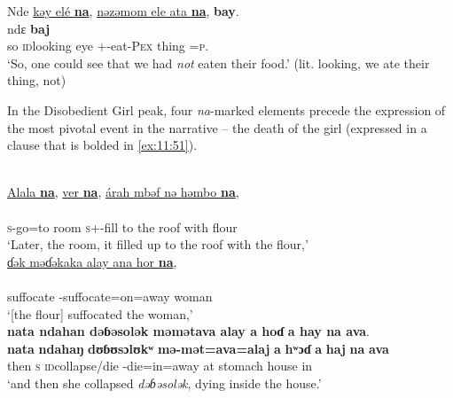 \ea \label{ex:11:50}
Nde  \underline{kəy  elé  \textbf{na}},  \underline{nəzəmom  ele  ata  \textbf{na}},  \textbf{bay}.\\
\gll  ndɛ                           \textbf{baj}\\
      so  \textsc{id}looking  eye  {\PSP}  +{\PFV}-eat-\textsc{Pex}    thing  =\textsc{p}.{\POSS}  {\PSP}  {\NEG}\\
\glt  ‘So, one could see that we had \textit{not} eaten their food.’ (lit. looking, we ate their thing, not)
\z

In the Disobedient Girl peak, four \textit{na}{}-marked elements precede the expression of the most pivotal event in the narrative -- the death of the girl (expressed in a clause that is bolded in \ref{ex:11:51}). 

\ea \label{ex:11:51}
\\
\underline{Alala  \textbf{na}},  \underline{ver  \textbf{na}},  \underline{árah  mbəf  nə  həmbo  \textbf{na}},\\ 
\gll  {}                    \\      
      \textsc{s}-go=to  {\PSP} room  {\PSP} \textsc{s}+{\IFV}-fill  {to the roof}  with  flour  {\PSP} \\      
\glt ‘Later, the room, it filled up to the roof with the flour,’\\

\medskip
\underline{ɗək  məɗəkaka  alay  ana  hor  \textbf{na}},\\
\gll {}        \\
     suffocate  {\NOM}{}-suffocate=on=away  {\DAT} woman  {\PSP}   \\ 
\glt ‘[the flour] suffocated the woman,’ \\

\medskip
\textbf{nata  ndahan  dəɓəsolək  məmətava  alay  a  hoɗ} \textbf{a  hay  na  ava}.\\
\gll \textbf{{nata}}  \textbf{ndahaŋ}   \textbf{dʊɓʊsɔlʊkʷ}   \textbf{mə-mət=ava=alaj}   \textbf{a}   \textbf{hʷɔɗ} \textbf{a}   \textbf{haj}   \textbf{na}   \textbf{ava}\\
     then    \textsc{s}  \textsc{id}collapse/die  {\NOM}{}-die=in=away  at  stomach {\GEN}  house  {\PSP}  in\\
\glt  ‘and then she collapsed \textit{dəɓəsolək}, dying inside the house.’
\z

